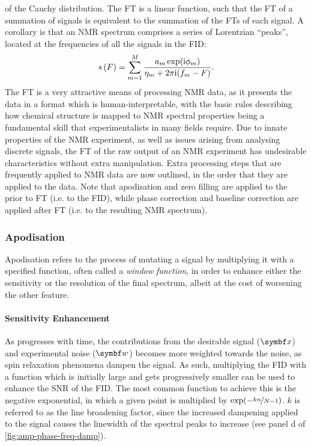 of the Cauchy distribution. The \ac{FT} is a linear function, such that the
\ac{FT} of a summation of signals is equivalent to the summation of the
\acp{FT} of each signal. A corollary is that an \ac{NMR} spectrum comprises a
series of Lorentzian ``peaks'', located at the frequencies of all the signals
in the \ac{FID}:
\begin{equation}
    s\left(F\right) = \sum_{m=1}^{M}
    \frac{a_m \exp(\mathrm{i} \phi_m)}
    {\eta_m + 2 \pi \mathrm{i} (f_m - F)}.
    \label{eq:ft-summation}
\end{equation}
The \ac{FT} is a very attractive means of processing \ac{NMR} data, as it
presents the data in a format which is human-interpretable, with the basic
rules describing how chemical structure is mapped to \ac{NMR} spectral
properties being a fundamental skill that experimentalists in many fields
require\cite{Hore2015b}. Due to innate properties of the \ac{NMR} experiment,
as well as issues arising from analysing discrete signals, the \ac{FT} of
the raw output of an \ac{NMR} experiment has undesirable
characteristics without extra manipulation. Extra processing
steps that are frequently applied to \ac{NMR} data are now outlined, in the
order that they are applied to the data. Note that apodisation and zero filling
are applied to the prior to \ac{FT} (i.e. to the \ac{FID}), while phase
correction and baseline correction are applied after \ac{FT} (i.e. to the
resulting \ac{NMR} spectrum).

\subsubsection{Apodisation}
Apodisation refers to the process of mutating a signal by multiplying it with a
specified function, often called a \emph{window function}\cite[Section
3.2.7]{Claridge2016}, in order to enhance
either the sensitivity or the resolution of the final spectrum, albeit
at the cost of worsening the other feature.

\paragraph{Sensitivity Enhancement} As  progresses with time, the
contributions from the desirable signal ($\bx$) and experimental noise ($\bw$)
becomes more
weighted towards the noise, as spin relaxation phenomena dampen the signal. As
such, multiplying the \ac{FID} with a function which is initially large and
gets progressively smaller can be used to enhance the \ac{SNR} of the
\ac{FID}. The most common function to achieve this is the negative exponential,
in which a given point is multiplied by $\exp(-\nicefrac{k n}{N - 1})$.
$k$ is referred to as the line broadening factor, since the increased dampening
applied to the signal causes the linewidth of the spectral peaks to increase
(see panel d of \cref{fig:amp-phase-freq-damp}).

